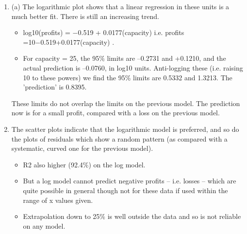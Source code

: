 \documentclass[a4paper,12pt]{article}
\begin{document}
\begin{enumerate}
\item  (a) The logarithmic plot shows that a linear regression in these units is a much better fit. There is still an increasing trend.
\begin{itemize}
\item log10(profits) = −0.519 + 0.0177(capacity)
i.e. profits =10−0.519+0.0177(capacity) .
\item For capacity = 25, the 95\% limits are –0.2731 and +0.1210, and the
actual prediction is –0.0760, in log10 units. Anti-logging these (i.e. raising 10
to these powers) we find the 95\% limits are 0.5332 and 1.3213.
The 'prediction' is 0.8395.
\end{itemize}
These limits do not overlap the limits on the previous model.
The prediction now is for a small profit, compared with a loss on the previous
model.
\item  The scatter plots indicate that the logarithmic model is preferred, and so do the
plots of residuals which show a random pattern (as compared with a
systematic, curved one for the previous model).
\begin{itemize}
\item R2 also higher (92.4\%) on the
log model.
\item But a log model cannot predict negative profits – i.e. losses – which are quite
possible in general though not for these data if used within the range of x
values given.
\item Extrapolation down to 25\% is well outside the data and so is not reliable on
any model.
\end{itemize}


\end{enumerate}
\end{document}
